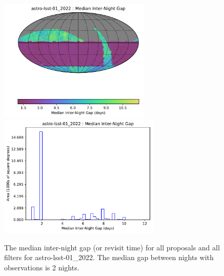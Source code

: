 \documentclass[DM,lsstdraft,authoryear,toc]{lsstdoc}
\begin{document}
\begin{figure}[htb]
\centering
\vskip -0.0in
\includegraphics[height=2.3in]{figures/astro-lsst-01_2022_Median_Inter-Night_Gap_HEAL_SkyMap.pdf}
\includegraphics[height=2.3in]{figures/astro-lsst-01_2022_Median_Inter-Night_Gap_HEAL_Histogram.pdf}
\vskip -0.1in
\caption{The median inter-night gap (or revisit time)  for all proposals and all filters for astro-lsst-01\_2022.
The median gap between nights with observations is 2 nights.
\label{fig:baseline_GapAll}}
\end{figure}
\end{document}
